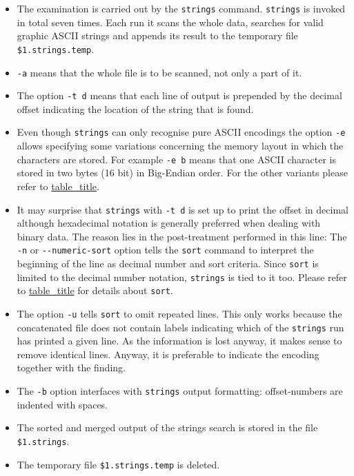 \begin{itemize}
\item
  The examination is carried out by the \texttt{strings} command.
  \texttt{strings} is invoked in total seven times. Each run it scans
  the whole data, searches for valid graphic ASCII strings and appends
  its result to the temporary file \texttt{\$1.strings.temp}.
\item
  \texttt{-a} means that the whole file is to be scanned, not only a
  part of it.
\item
  The option \texttt{-t\ d} means that each line of output is prepended
  by the decimal offset indicating the location of the string that is
  found.
\item
  Even though \texttt{strings} can only recognise pure ASCII encodings
  the option \texttt{-e} allows specifying some variations concerning
  the memory layout in which the characters are stored. For example
  \texttt{-e\ b} means that one ASCII character is stored in two bytes
  (16 bit) in Big-Endian order. For the other variants please refer to
  \protect\hyperlink{legend-strings}{table\_title}.
\item
  It may surprise that \texttt{strings} with \texttt{-t\ d} is set up to
  print the offset in decimal although hexadecimal notation is generally
  preferred when dealing with binary data. The reason lies in the
  post-treatment performed in this line: The \texttt{-n} or
  \texttt{-\/-numeric-sort} option tells the \texttt{sort} command to
  interpret the beginning of the line as decimal number and sort
  criteria. Since \texttt{sort} is limited to the decimal number
  notation, \texttt{strings} is tied to it too. Please refer to
  \protect\hyperlink{legend-sort}{table\_title} for details about
  \texttt{sort}.
\item
  The option \texttt{-u} tells \texttt{sort} to omit repeated lines.
  This only works because the concatenated file does not contain labels
  indicating which of the \texttt{strings} run has printed a given line.
  As the information is lost anyway, it makes sense to remove identical
  lines. Anyway, it is preferable to indicate the encoding together with
  the finding.
\item
  The \texttt{-b} option interfaces with \texttt{strings} output
  formatting: offset-numbers are indented with spaces.
\item
  The sorted and merged output of the strings search is stored in the
  file \texttt{\$1.strings}.
\item
  The temporary file \texttt{\$1.strings.temp} is deleted.
\end{itemize}


